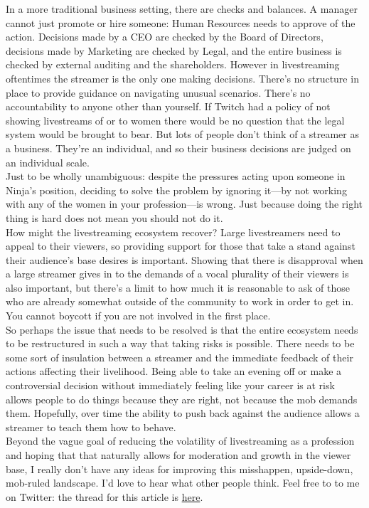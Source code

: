 \documentclass{article}
\begin{document}
In a more traditional business setting, there are checks and balances. A manager cannot just promote or hire someone: Human Resources needs to approve of the action. Decisions made by a CEO are checked by the Board of Directors, decisions made by Marketing are checked by Legal, and the entire business is checked by external auditing and the shareholders. However in livestreaming oftentimes the streamer is the only one making decisions. There's no structure in place to provide guidance on navigating unusual scenarios. There's no accountability to anyone other than yourself. If Twitch had a policy of not showing livestreams of or to women there would be no question that the legal system would be brought to bear. But lots of people don't think of a streamer as a business. They're an individual, and so their business decisions are judged on an individual scale.\\

Just to be wholly unambiguous: despite the pressures acting upon someone in Ninja's position, deciding to solve the problem by ignoring it---by not working with any of the women in your profession---is wrong. Just because doing the right thing is hard does not mean you should not do it.\\

How might the livestreaming ecosystem recover? Large livestreamers need to appeal to their viewers, so providing support for those that take a stand against their audience's base desires is important. Showing that there is disapproval when a large streamer gives in to the demands of a vocal plurality of their viewers is also important, but there's a limit to how much it is reasonable to ask of those who are already somewhat outside of the community to work in order to get in. You cannot boycott if you are not involved in the first place.\\

So perhaps the issue that needs to be resolved is that the entire ecosystem needs to be restructured in such a way that taking risks is possible. There needs to be some sort of insulation between a streamer and the immediate feedback of their actions affecting their livelihood. Being able to take an evening off or make a controversial decision without immediately feeling like your career is at risk allows people to do things because they are right, not because the mob demands them. Hopefully, over time the ability to push back against the audience allows a streamer to teach them how to behave.\\

Beyond the vague goal of reducing the volatility of livestreaming as a profession and hoping that that naturally allows for moderation and growth in the viewer base, I really don't have any ideas for improving this misshappen, upside-down, mob-ruled landscape. I'd love to hear what other people think. Feel free to to me on Twitter: the thread for this article is \href{https://twitter.com/KleeneAlgebraCo/status/1031695417145286657}{here}.
\end{document}
